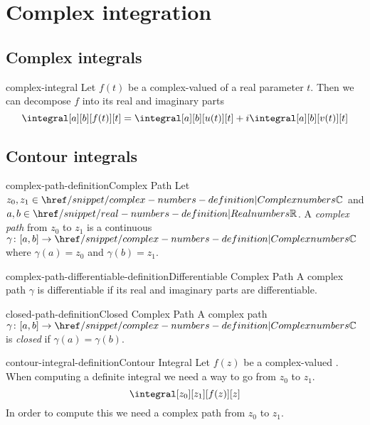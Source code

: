 \documentclass[preview]{standalone}
\begin{document}
\genpage

\section{Complex integration}

\subsection{Complex integrals}

\begin{snippet}{complex-integral}
    Let \(f(t)\) be a complex-valued \function of a real parameter \(t\). Then
    we can decompose \(f\) into its real and imaginary parts
    \[
        \integral[a][b][f(t)][t]=\integral[a][b][u(t)][t]+i\integral[a][b][v(t)][t]
    \]
\end{snippet}

\subsection{Contour integrals}

\begin{snippetdefinition}{complex-path-definition}{Complex Path}
    Let \(z_0, z_1 \in \complexnumbers\) and \(a,b\in \realnumbers\).
    A \textit{complex path} from \(z_0\) to \(z_1\) is a continuous \function
    \(\gamma\colon [a,b] \to \complexnumbers\) where \(\gamma(a)=z_0\) and \(\gamma(b)=z_1\).
\end{snippetdefinition}

\begin{snippetdefinition}{complex-path-differentiable-definition}{Differentiable Complex Path}
    A complex path \(\gamma\) is differentiable if its real and imaginary parts are differentiable.
\end{snippetdefinition}

\begin{snippetdefinition}{closed-path-definition}{Closed Complex Path}
    A complex path \(\gamma\colon [a,b] \to \complexnumbers\)
    is \textit{closed} if \(\gamma(a)=\gamma(b)\).
\end{snippetdefinition}

\begin{snippetdefinition}{contour-integral-definition}{Contour Integral}
    Let \(f(z)\) be a complex-valued \function.
    When computing a definite integral we need a way to go from \(z_0\) to \(z_1\).
    \[
        \integral[z_0][z_1][f(z)][z]
    \]
    In order to compute this we need a complex path from \(z_0\) to \(z_1\).
\end{snippetdefinition}
\end{document}
